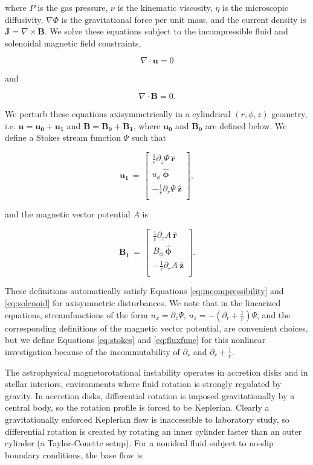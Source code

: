 \documentclass{emulateapj}
\newcommand{\beq}{\begin{equation}}
\newcommand{\eeq}{\end{equation}}
\newcommand{\uphi}{\ensuremath{u_\phi}}
\newcommand{\rhat}{\ensuremath{\mathbf{\hat{r}}}}
\newcommand{\phihat}{\ensuremath{\mathbf{\hat{\phi}}}}
\newcommand{\zhat}{\ensuremath{\mathbf{\hat{z}}}}
\begin{document}
where $P$ is the gas pressure, $\nu$ is the kinematic viscosity, $\eta$ is the microscopic diffusivity, $\nabla\Phi$ is the gravitational force per unit mass, and the current density is $\mathbf{J} = \nabla\times\mathbf{B}$. We solve these equations subject to the incompressible fluid and solenoidal magnetic field constraints,

\beq
\label{eq:incompressibility}
\nabla \cdot \mathbf{u} = 0
\eeq

and 

\beq
\label{eq:solenoid}
\nabla \cdot \mathbf{B} = 0.
\eeq

We perturb these equations axisymmetrically in a cylindrical $(r, \phi, z)$ geometry, i.e. $\mathbf{u} = \mathbf{u_0} + \mathbf{u_1}$ and $\mathbf{B} = \mathbf{B_0} + \mathbf{B_1}$, where $\mathbf{u_0}$ and $\mathbf{B_0}$ are defined below. We define a Stokes stream function $\Psi$ such that 

\beq
  \label{eq:stokes}
  \mathbf{u_1} \, = \, \left[\begin{matrix}
\frac{1}{r} \partial_z \Psi\ \rhat\\
\uphi \ \phihat\\
-\frac{1}{r} \partial_r \Psi\ \zhat\\
\end{matrix}\right],
\eeq

and the magnetic vector potential $A$ is

\beq
  \label{eq:fluxfunc}
  \mathbf{B_1} \, = \, \left[\begin{matrix}
\frac{1}{r} \partial_z A\ \rhat\\
B_{\phi} \ \phihat\\
-\frac{1}{r} \partial_r A\ \zhat\\
\end{matrix}\right].
\eeq

These definitions automatically satisfy Equations \ref{eq:incompressibility} and \ref{eq:solenoid} for axisymmetric disturbances. We note that in the linearized equations, streamfunctions of the form $u_x = \partial_z \Psi$, $u_z = -(\partial_r + \frac{1}{r}) \Psi$, and the corresponding definitions of the magnetic vector potential, are convenient choices, but we define Equations \ref{eq:stokes} and \ref{eq:fluxfunc} for this nonlinear investigation because of the incommutability of $\partial_r$ and $\partial_r + \frac{1}{r}$. 

The astrophysical magnetorotational instability operates in accretion disks and in stellar interiors, environments where fluid rotation is strongly regulated by gravity. In accretion disks, differential rotation is imposed gravitationally by a central body, so the rotation profile is forced to be Keplerian. Clearly a gravitationally enforced Keplerian flow is inaccessible to laboratory study, so differential rotation is created by rotating an inner cylinder faster than an outer cylinder (a Taylor-Couette setup). For a nonideal fluid subject to no-slip boundary conditions, the base flow is
\end{document}
